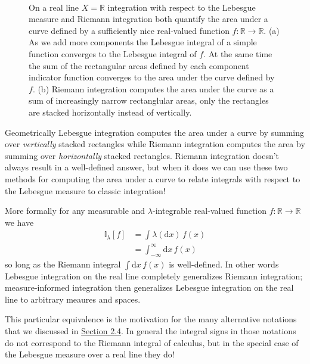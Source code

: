 \documentclass[
  letterpaper,
  DIV=11,
  numbers=noendperiod]{scrartcl}
\begin{document}
\begin{figure}
\begin{minipage}[t]{0.90\linewidth}
{}

\subcaption{\label{fig-riemann}}
\end{minipage}%
%
\begin{minipage}[t]{0.05\linewidth}

{\centering 

~

}

\end{minipage}%

\caption{\label{fig-integrate}On a real line \(X = \mathbb{R}\)
integration with respect to the Lebesgue measure and Riemann integration
both quantify the area under a curve defined by a sufficiently nice
real-valued function \(f : \mathbb{R} \rightarrow \mathbb{R}\). (a) As
we add more components the Lebesgue integral of a simple function
converges to the Lebesgue integral of \(f\). At the same time the sum of
the rectangular areas defined by each component indicator function
converges to the area under the curve defined by \(f\). (b) Riemann
integration computes the area under the curve as a sum of increasingly
narrow rectanglular areas, only the rectangles are stacked horizontally
instead of vertically.}

\end{figure}

Geometrically Lebesgue integration computes the area under a curve by
summing over \emph{vertically} stacked rectangles while Riemann
integration computes the area by summing over \emph{horizontally}
stacked rectangles. Riemann integration doesn't always result in a
well-defined answer, but when it does we can use these two methods for
computing the area under a curve to relate integrals with respect to the
Lebesgue measure to classic integration!

More formally for any measurable and \(\lambda\)-integrable real-valued
function \(f: \mathbb{R} \rightarrow \mathbb{R}\) we have \begin{align*}
\mathbb{I}_{\lambda}[f]
&= \int \lambda( \mathrm{d} x) \, f(x)
\\
&= \int_{-\infty}^{\infty} \mathrm{d} x \, f(x)
\end{align*} so long as the Riemann integral
\(\int \mathrm{d} x \, f(x)\) is well-defined. In other words Lebesgue
integration on the real line completely generalizes Riemann integration;
measure-informed integration then generalizes Lebesgue integration on
the real line to arbitrary meaures and spaces.

This particular equivalence is the motivation for the many alternative
notations that we discussed in \href{@sec:alt_notations}{Section 2.4}.
In general the integral signs in those notations do not correspond to
the Riemann integral of calculus, but in the special case of the
Lebesgue measure over a real line they do!
\end{document}
